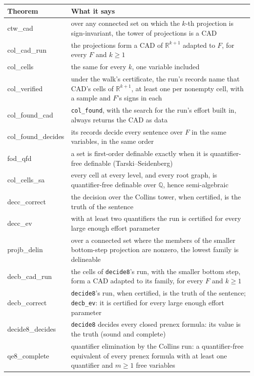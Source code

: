 \documentclass[11pt]{article}
\newcommand\code[1]{\mbox{\texttt{#1}}}
\begin{document}
{\small
\begin{longtable}{@{}>{\ttfamily}p{} p{}@{}}
\toprule
\textsf{\small\bfseries Theorem} & \textsf{\small\bfseries What it says}\\
\midrule
ctw\_cad & over any connected set on which the $k$-th projection is sign-invariant, the tower of projections is a CAD\\
col\_cad\_run & the projections form a CAD of $\mathbb{R}^{k+1}$ adapted to $F$, for every $F$ and $k\ge1$\\
col\_cells & the same for every $k$, one variable included\\
col\_verified & under the walk's certificate, the run's records name that CAD's cells of $\mathbb{R}^{k+1}$, at least one per nonempty cell, with a sample and $F$'s signs in each\\
col\_found\_cad & \texttt{col\_found}, with the search for the run's effort built in, always returns the CAD as data\\
col\_found\_decides & its records decide every sentence over $F$ in the same variables, in the same order\\
fod\_qfd & a set is first-order definable exactly when it is quantifier-free definable (Tarski--Seidenberg)\\
col\_cells\_sa & every cell at every level, and every root graph, is quantifier-free definable over $\mathbb{Q}$, hence semi-algebraic\\
decc\_correct & the decision over the Collins tower, when certified, is the truth of the sentence\\
decc\_ev & with at least two quantifiers the run is certified for every large enough effort parameter\\
projb\_delin & over a connected set where the members of the smaller bottom-step projection are nonzero, the lowest family is delineable\\
decb\_cad\_run & the cells of \texttt{decide8}'s run, with the smaller bottom step, form a CAD adapted to its family, for every $F$ and $k\ge1$\\
decb\_correct & \texttt{decide8}'s run, when certified, is the truth of the sentence; \code{decb\_ev}: it is certified for every large enough effort parameter\\
decide8\_decides & \texttt{decide8} decides every closed prenex formula: its value is the truth (sound and complete)\\
qe8\_complete & quantifier elimination by the Collins run: a quantifier-free equivalent of every prenex formula with at least one quantifier and $m \ge 1$ free variables\\

\end{longtable}}
\end{document}
